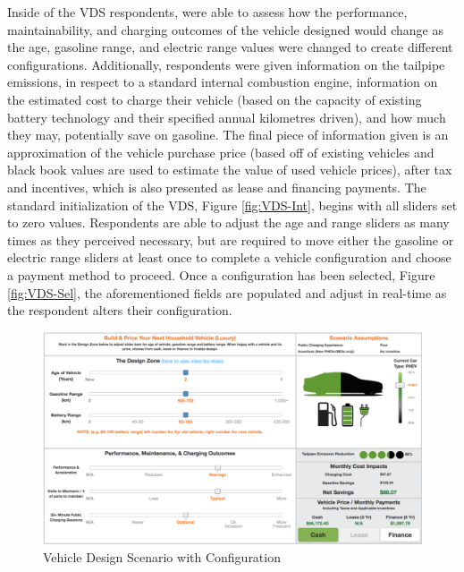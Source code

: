 \documentclass[]{elsarticle} %
\begin{document}
Inside of the VDS respondents, were able to assess how the performance,
maintainability, and charging outcomes of the vehicle designed would
change as the age, gasoline range, and electric range values were
changed to create different configurations. Additionally, respondents
were given information on the tailpipe emissions, in respect to a
standard internal combustion engine, information on the estimated cost
to charge their vehicle (based on the capacity of existing battery
technology and their specified annual kilometres driven), and how much
they may, potentially save on gasoline. The final piece of information
given is an approximation of the vehicle purchase price (based off of
existing vehicles and black book values are used to estimate the value
of used vehicle prices), after tax and incentives, which is also
presented as lease and financing payments. The standard initialization
of the VDS, Figure \ref{fig:VDS-Int}, begins with all sliders set to
zero values. Respondents are able to adjust the age and range sliders as
many times as they perceived necessary, but are required to move either
the gasoline or electric range sliders at least once to complete a
vehicle configuration and choose a payment method to proceed. Once a
configuration has been selected, Figure \ref{fig:VDS-Sel}, the
aforementioned fields are populated and adjust in real-time as the
respondent alters their configuration.

\begin{figure}

{\centering \includegraphics[width=1\linewidth]{figures/VDS_Selected} 

}

\caption{\label{fig:VDS-Sel}Vehicle Design Scenario with Configuration}\label{fig:fig-VDS-Sel}
\end{figure}
\end{document}
